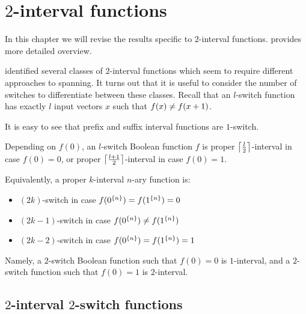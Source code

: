 \chapter{\texorpdfstring{$2$}{2}-interval functions}
\label{chap:2interval}


In this chapter we will revise the results specific to
$2$-interval functions.
\citet{Dubovsky2012}
provides more detailed overview.

\citeauthor{Dubovsky2012} identified several classes
of $2$-interval functions \citep[p.~5]{Dubovsky2012}
which seem to require different approaches to spanning.
It turns out that it is useful to consider
the number of switches
to differentiate between these classes.
Recall that an $l$-switch function has exactly $l$ input
vectors $x$ such that $\apply{f}{x} \neq \apply{f}{x+1}$.

It is easy to see that
prefix and suffix interval functions are $1$-switch.

Depending on $f(0)$,
an $l$-switch Boolean function $f$
is proper $\ceil*{\frac{l}{2}}$-interval
in case $f(0) = 0$,
or proper $\ceil*{\frac{l+1}{2}}$-interval
in case $f(0) = 1$.

Equivalently,
a proper $k$-interval $n$-ary function is:

\begin{itemize}
\item
$(2k)$-switch in case $f(\rep{0}{n}) = f(\rep{1}{n}) = 0$
\item
$(2k-1)$-switch in case $f(\rep{0}{n}) \neq f(\rep{1}{n})$
\item
$(2k-2)$-switch in case $f(\rep{0}{n}) = f(\rep{1}{n}) = 1$
\end{itemize}

Namely,
a $2$-switch Boolean function such that $f(0) = 0$
is $1$-interval,
and a $2$-switch function such that $f(0) = 1$
is $2$-interval.

\section{\texorpdfstring{$2$}{2}-interval
\texorpdfstring{$2$}{2}-switch functions}
\label{sec:2int2switch}

